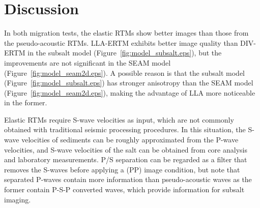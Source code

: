 \documentclass[manuscript,ulem,graphix,revised]{geophysics}
\begin{document}
%

\section{Discussion}
\indent\indent
In both migration tests, the elastic RTMs show better images than those from the pseudo-acoustic RTMs. LLA-ERTM exhibits better image quality than DIV-ERTM in the subsalt model (Figure~\ref{fig:model_subsalt.eps}), but the improvements are not significant in the SEAM model (Figure~\ref{fig:model_seam2d.eps}). A possible reason is that the subsalt model (Figure~\ref{fig:model_subsalt.eps}) has stronger anisotropy than the SEAM model (Figure~\ref{fig:model_seam2d.eps}), making the advantage of LLA more noticeable in the former. 

Elastic RTMs require S-wave velocities as input, which are not commonly obtained with traditional seismic processing procedures. In this situation, the S-wave velocities of sediments can be roughly approximated from the P-wave velocities, and S-wave velocities of the salt can be obtained from core analysis and laboratory measurements. P/S separation can be regarded as a filter that removes the S-waves before applying a (PP) image condition, but note that separated P-waves contain more information than pseudo-acoustic waves as the former contain P-S-P converted waves, which provide information for subsalt imaging.
\end{document}
